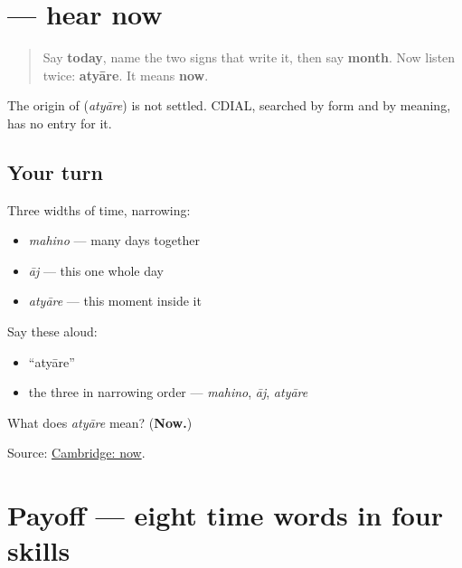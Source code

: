 \section[\texorpdfstring{\gu{અત્યારે} (atyāre)}{અત્યારે (atyāre)}]{ — hear now}

\label{lesson:GU-C24-hear-atyaare}



\begin{quote}
Say \textbf{today}, name the two signs that write it, then say \textbf{month}. Now listen twice: \textbf{atyāre}. It means \textbf{now}.
\end{quote}

\begin{cousinweb}
The origin of \textbf{} (\emph{atyāre}) is not settled. CDIAL, searched by form and by meaning, has no entry for it.
\end{cousinweb}

\subsection*{Your turn}
Three widths of time, narrowing:

\begin{itemize}
\raggedright
  \item \emph{mahino} — many days together
  \item \emph{āj} — this one whole day
  \item \emph{atyāre} — this moment inside it
\end{itemize}

Say these aloud:

\begin{itemize}
\raggedright
  \item \textquotedblleft{}atyāre\textquotedblright{}
  \item the three in narrowing order — \emph{mahino}, \emph{āj}, \emph{atyāre}
\end{itemize}

\begin{tcolorbox}[breakable,colback=teal!4,colframe=teal!35!black,title={Before you move on}]
What does \emph{atyāre} mean? (\textbf{Now.})

Source: \href{https://dictionary.cambridge.org/dictionary/english-gujarati/now}{Cambridge: now}.
\end{tcolorbox}
\section[Practice]{Payoff — eight time words in four skills}

